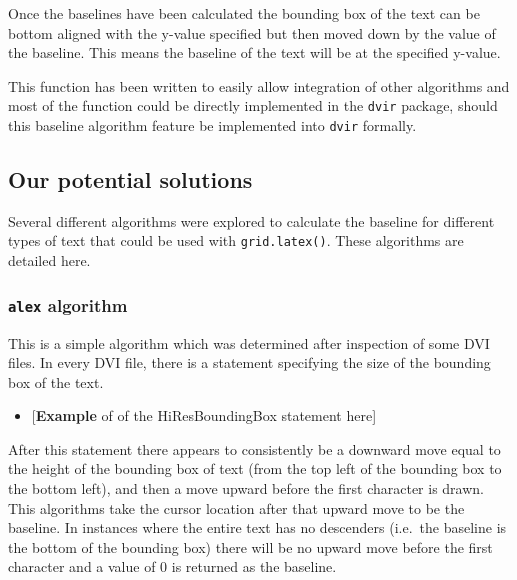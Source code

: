 \documentclass[]{article}
\newenvironment{Shaded}{\begin{snugshade}}{\end{snugshade}}
\newcommand{\KeywordTok}[1]{\textcolor[rgb]{0.13,0.29,0.53}{\textbf{#1}}}
\newcommand{\DataTypeTok}[1]{\textcolor[rgb]{0.13,0.29,0.53}{#1}}
\newcommand{\CharTok}[1]{\textcolor[rgb]{0.31,0.60,0.02}{#1}}
\newcommand{\StringTok}[1]{\textcolor[rgb]{0.31,0.60,0.02}{#1}}
\newcommand{\NormalTok}[1]{#1}
\providecommand{\tightlist}{%
  \setlength{\itemsep}{0pt}\setlength{\parskip}{0pt}}
\begin{document}
Once the baselines have been calculated the bounding box of the text can
be bottom aligned with the y-value specified but then moved down by the
value of the baseline. This means the baseline of the text will be at
the specified y-value.

This function has been written to easily allow integration of other
algorithms and most of the function could be directly implemented in the
\texttt{dvir} package, should this baseline algorithm feature be
implemented into \texttt{dvir} formally.

\subsection{Our potential solutions}\label{our-potential-solutions}

Several different algorithms were explored to calculate the baseline for
different types of text that could be used with \texttt{grid.latex()}.
These algorithms are detailed here.

\subsubsection{\texorpdfstring{\texttt{alex}
algorithm}{alex algorithm}}\label{alex-algorithm}

This is a simple algorithm which was determined after inspection of some
DVI files. In every DVI file, there is a statement specifying the size
of the bounding box of the text.

\begin{itemize}
\tightlist
\item
  {[}\textbf{Example} of of the HiResBoundingBox statement here{]}
\end{itemize}

After this statement there appears to consistently be a downward move
equal to the height of the bounding box of text (from the top left of
the bounding box to the bottom left), and then a move upward before the
first character is drawn. This algorithms take the cursor location after
that upward move to be the baseline. In instances where the entire text
has no descenders (i.e.~the baseline is the bottom of the bounding box)
there will be no upward move before the first character and a value of 0
is returned as the baseline.

\begin{Shaded}
\end{Shaded}
\end{document}
